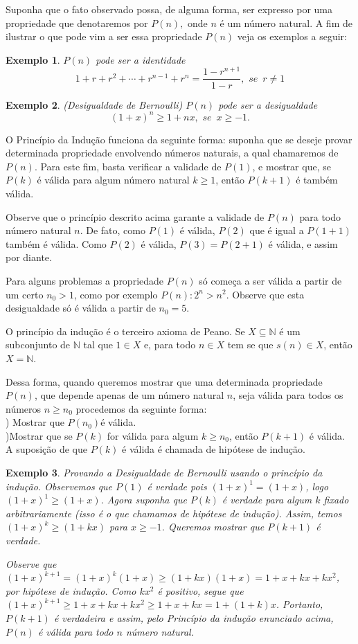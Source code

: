 \documentclass[10pt]{article}
\newtheorem{exemplo}{Exemplo}
\begin{document}
Suponha que o fato observado possa, de alguma forma, ser expresso por uma propriedade que denotaremos por $P(n),$ onde $n$ é um número natural. A fim de ilustrar o que pode vim a ser essa propriedade $P(n)$ veja os exemplos a seguir:
\begin{exemplo}$P(n)$ pode ser a identidade $$1+r+r^2+\cdots + r^{n-1}+r^n=\dfrac{1-r^{n+1}}{1-r},\, \,  se\, \, \,  r\neq 1$$
\end{exemplo}
\begin{exemplo}(Desigualdade de Bernoulli) $P(n)$ pode ser a desigualdade $$(1+x)^n\geq 1+nx,\, \,  se\, \, \,  x\geq -1.$$
\end{exemplo}
O Princípio da Indução funciona da seguinte forma: suponha que se deseje provar determinada propriedade envolvendo números naturais, a qual chamaremos de $P(n)$. Para este fim, basta verificar a validade de $P(1)$, e mostrar que, se $P(k)$ é válida para algum número natural $k\geq 1$, então $P(k+1)$ é também válida.

Observe que o princípio descrito acima garante a validade de $P(n)$ para todo número natural $n$. De fato, como $P(1)$ é válida, $P(2)$ que é igual a $P(1+1)$ também é válida. Como $P(2)$ é válida, $P(3)=P(2+1)$ é válida, e assim por diante.

Para alguns problemas a propriedade $P(n)$ só começa a ser válida a partir de um certo $n_0>1$, como por exemplo $P(n): 2^n> n^2$. Observe que esta desigualdade só é válida a partir de $n_0=5$.

 O princípio da indução é o terceiro axioma de Peano.
Se $X\subseteq \mathbb{N}$ é um subconjunto de $\mathbb{N}$ tal que $1\in X$ e, para todo $n\in X$ tem se que $s(n)\in X$, então $X=\mathbb{N}$.

Dessa forma, quando queremos mostrar que uma determinada propriedade $P(n)$, que depende apenas de um número natural $n$, seja válida para todos os números $n\geq n_0$ procedemos da seguinte forma:\\
) Mostrar que $P(n_0)$é válida.\\
)Mostrar que se $P(k)$ for válida para algum $k\geq n_0$, então $P(k+1)$ é válida.\\
 A suposição de que $P(k)$ é válida é chamada de hipótese de indução.

\begin{exemplo}
Provando a Desigualdade de Bernoulli usando o princípio da indução.
Observemos que $P(1)$ é verdade pois $(1+x)^{1}=(1+x)$, logo $(1+x)^{1}\geq (1+x)$. Agora suponha que $P(k)$ é verdade para algum $k$ fixado arbitrariamente (isso é o que chamamos de hipótese de indução). Assim, temos $(1+x)^{k}\geq (1+kx)$ para $x\geq -1$. Queremos mostrar que $P(k+1)$ é verdade.

Observe que $(1+x)^{k+1}=(1+x)^k(1+x)\geq (1+kx)(1+x)= 1+x+kx+kx^2$, por hipótese de indução. Como $kx^2$ é positivo, segue que $(1+x)^{k+1}\geq 1+x+kx+kx^2\geq 1+x+kx=1+(1+k)x$. Portanto, $P(k+1)$ é verdadeira e assim, pelo Princípio da indução enunciado acima,  $P(n)$ é válida para todo $n$ número natural.

\end{exemplo}
\end{document}
